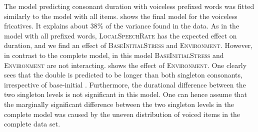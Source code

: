  
\begin{table}
	\caption{Summary of linear model for variables predicting the Box-Cox-transformed duration of [s] in prefixed words with voiceless /s/\label{tbl: summary model6}}
\end{table}

The model predicting consonant duration with voiceless prefixed words was fitted similarly to the model with all items. 
 shows the final model for the voiceless fricatives. It explains about 38\% of the variance found in the data. 
As in the model with all prefixed words, \textsc{LocalSpeechRate} has the expected effect on duration, and we find an effect of \textsc{BaseInitialStress} and \textsc{Environment}. However, in contrast to the complete model, in this model \textsc{BaseInitialStress} and \textsc{Environment} are not interacting. 
 shows the effect of  \textsc{Environment}. One clearly sees that the double is predicted to be longer than both singleton consonants, irrespective of base-initial . Furthermore, the durational difference between the two singleton levels is not significant in this model. One can hence assume that the marginally significant difference between the two singleton levels in the complete model was caused by the uneven distribution of voiced items in the complete data set. 


